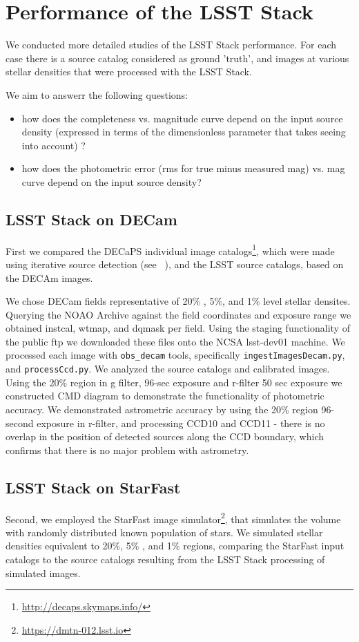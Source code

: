 \documentclass[DM,lsstdraft,toc,usenatbib]{lsstdoc}
\begin{document}
\section{Performance of the LSST Stack}
We conducted more detailed studies of the LSST Stack performance. For each case there is a source catalog considered as ground 'truth', and images at various stellar densities that were processed with the LSST Stack. 

We aim to answerr the following questions: 

\begin{itemize}
\item how does the completeness vs. magnitude curve depend on the input source density  (expressed in terms of the dimensionless parameter that takes seeing into account) ? 
\item how does the photometric error (rms for true minus measured mag) vs. mag curve   depend on the input source density?
\end{itemize}

\subsection{LSST Stack on DECam}
 First we compared the DECaPS individual image catalogs\footnote{\url{http://decaps.skymaps.info/}}, which were made using iterative source detection (see ~\cite{schlafly2017}), and the LSST source catalogs, based on the  DECAm images.

We chose DECam fields representative of 20\% , 5\%, and 1\% level stellar densites. Querying the NOAO Archive against the field coordinates and  exposure range we obtained instcal,  wtmap, and dqmask per field. Using the staging functionality of the public ftp we downloaded these files onto the NCSA lsst-dev01 machine.  We processed each image with \verb|obs_decam| tools, specifically \verb|ingestImagesDecam.py|, and \verb|processCcd.py|. We analyzed the source catalogs and calibrated images. Using the 20\% region in g filter, 96-sec exposure and r-filter 50 sec exposure we constructed CMD diagram to demonstrate the functionality of photometric accuracy.  We demonstrated astrometric accuracy by using the 20\% region 96-second exposure in r-filter, and processing CCD10 and CCD11 - there is no overlap in the position of detected sources along the CCD boundary, which confirms that there is no major problem with astrometry. 



\subsection{LSST Stack on StarFast }
Second, we employed the StarFast image simulator\footnote{\url{https://dmtn-012.lsst.io}}, that simulates the volume with randomly distributed known population of stars. We simulated stellar densities equivalent to 20\%, 5\% , and 1\% regions, comparing the StarFast input catalogs to the source catalogs resulting from the LSST Stack processing of simulated images. 
\end{document}
